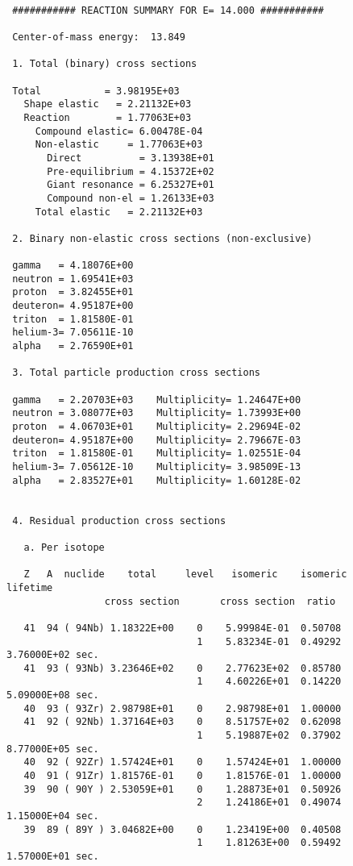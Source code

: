 \begin{samplecase}
{\small \begin{verbatim}

 ########### REACTION SUMMARY FOR E= 14.000 ###########

 Center-of-mass energy:  13.849

 1. Total (binary) cross sections

 Total           = 3.98195E+03
   Shape elastic   = 2.21132E+03
   Reaction        = 1.77063E+03
     Compound elastic= 6.00478E-04
     Non-elastic     = 1.77063E+03
       Direct          = 3.13938E+01
       Pre-equilibrium = 4.15372E+02
       Giant resonance = 6.25327E+01
       Compound non-el = 1.26133E+03
     Total elastic   = 2.21132E+03

 2. Binary non-elastic cross sections (non-exclusive)

 gamma   = 4.18076E+00
 neutron = 1.69541E+03
 proton  = 3.82455E+01
 deuteron= 4.95187E+00
 triton  = 1.81580E-01
 helium-3= 7.05611E-10
 alpha   = 2.76590E+01

 3. Total particle production cross sections

 gamma   = 2.20703E+03    Multiplicity= 1.24647E+00
 neutron = 3.08077E+03    Multiplicity= 1.73993E+00
 proton  = 4.06703E+01    Multiplicity= 2.29694E-02
 deuteron= 4.95187E+00    Multiplicity= 2.79667E-03
 triton  = 1.81580E-01    Multiplicity= 1.02551E-04
 helium-3= 7.05612E-10    Multiplicity= 3.98509E-13
 alpha   = 2.83527E+01    Multiplicity= 1.60128E-02


 4. Residual production cross sections

   a. Per isotope

   Z   A  nuclide    total     level   isomeric    isomeric    lifetime
                 cross section       cross section  ratio

   41  94 ( 94Nb) 1.18322E+00    0    5.99984E-01  0.50708
                                 1    5.83234E-01  0.49292   3.76000E+02 sec.
   41  93 ( 93Nb) 3.23646E+02    0    2.77623E+02  0.85780
                                 1    4.60226E+01  0.14220   5.09000E+08 sec.
   40  93 ( 93Zr) 2.98798E+01    0    2.98798E+01  1.00000
   41  92 ( 92Nb) 1.37164E+03    0    8.51757E+02  0.62098
                                 1    5.19887E+02  0.37902   8.77000E+05 sec.
   40  92 ( 92Zr) 1.57424E+01    0    1.57424E+01  1.00000
   40  91 ( 91Zr) 1.81576E-01    0    1.81576E-01  1.00000
   39  90 ( 90Y ) 2.53059E+01    0    1.28873E+01  0.50926
                                 2    1.24186E+01  0.49074   1.15000E+04 sec.
   39  89 ( 89Y ) 3.04682E+00    0    1.23419E+00  0.40508
                                 1    1.81263E+00  0.59492   1.57000E+01 sec.


\end{verbatim}}
\end{samplecase}
